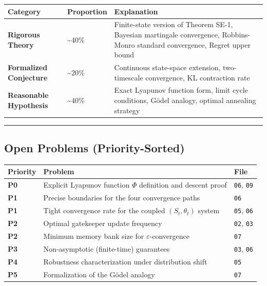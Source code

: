 \documentclass[
  12pt,
]{article}
\begin{document}
\begin{longtable}[]{@{}
  >{\raggedright\arraybackslash}p{}
  >{\raggedright\arraybackslash}p{}
  >{\raggedright\arraybackslash}p{}@{}}
\toprule\noalign{}
\begin{minipage}[b]{\linewidth}\raggedright
Category
\end{minipage} & \begin{minipage}[b]{\linewidth}\raggedright
Proportion
\end{minipage} & \begin{minipage}[b]{\linewidth}\raggedright
Explanation
\end{minipage} \\
\midrule\noalign{}
\endhead
\bottomrule\noalign{}
\endlastfoot
\textbf{Rigorous Theory} & \textasciitilde40\% & Finite-state version of Theorem SE-1, Bayesian martingale convergence, Robbins-Monro standard convergence, Regret upper bound \\
\textbf{Formalized Conjecture} & \textasciitilde20\% & Continuous state-space extension, two-timescale convergence, KL contraction rate \\
\textbf{Reasonable Hypothesis} & \textasciitilde40\% & Exact Lyapunov function form, limit cycle conditions, G\"odel analogy, optimal annealing strategy \\
\end{longtable}

\begin{center}\rule{0.5\linewidth}{0.5pt}\end{center}

\subsection{Open Problems (Priority-Sorted)}\label{open-problems}

\begin{longtable}[]{@{}lll@{}}
\toprule\noalign{}
Priority & Problem & File \\
\midrule\noalign{}
\endhead
\bottomrule\noalign{}
\endlastfoot
\textbf{P0} & Explicit Lyapunov function \(\Phi\) definition and descent proof &
\texttt{06}, \texttt{09} \\
\textbf{P1} & Precise boundaries for the four convergence paths & \texttt{06} \\
\textbf{P1} & Tight convergence rate for the coupled \((S_t, \theta_t)\) system & \texttt{05},
\texttt{06} \\
\textbf{P2} & Optimal gatekeeper update frequency & \texttt{02}, \texttt{03} \\
\textbf{P2} & Minimum memory bank size for \(\varepsilon\)-convergence & \texttt{07} \\
\textbf{P3} & Non-asymptotic (finite-time) guarantees & \texttt{03}, \texttt{06} \\
\textbf{P4} & Robustness characterization under distribution shift & \texttt{05} \\
\textbf{P5} & Formalization of the G\"odel analogy & \texttt{07} \\
\end{longtable}
\end{document}
